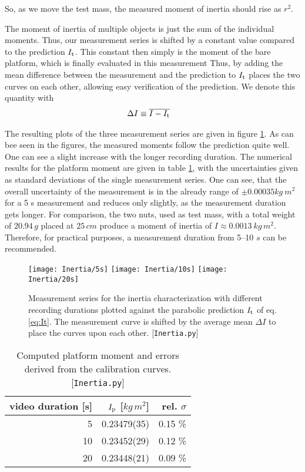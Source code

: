 \documentclass[journal]{IEEEtran}
\begin{document}
So, as we move the test mass, the measured moment of inertia should rise as $r^2$.

The moment of inertia of multiple objects is just the sum of the individual moments. Thus, our measurement series is shifted by a constant value compared to the prediction $I_{\textup{t}}$. This constant then simply is the moment of the bare platform, which is finally evaluated in this measurement
Thus, by adding the mean difference between the measurement and the prediction to $I_{\textup{t}}$ places the two curves on each other, allowing easy verification of the prediction.
We denote this quantity with
\begin{align}
	\Delta I & \equiv \overline{I - I_{\textup{t}}}
	\label{eq:DeltaI}
\end{align}

The resulting plots of the three measurement series are given in figure \ref{fig:Inertia}.
As can bee seen in the figures, the measured moments follow the prediction quite well. One can see a slight increase with the longer recording duration.
The numerical results for the platform moment are given in table \ref{tab:Inertia}, with the uncertainties given as standard deviations of the single measurement series.
One can see, that the overall uncertainty of the measurement is in the already range of $\pm 0.00035 \unit{kg~m^2}$ for a 5 s measurement and reduces only slightly, as the measurement duration gets longer. For comparison, the two nuts, used as test mass, with a total weight of $20.94\,\unit{g}$ placed at $25\,\unit{cm}$ produce a moment of inertia of $I \approx 0.0013~\unit{kg\,m^2}$.
Therefore, for practical purposes, a measurement duration from 5--10 $\unit{s}$ can be recommended.

\begin{figure}[t]
	\centering
	\texttt{[image: Inertia/5s]}
	\texttt{[image: Inertia/10s]}
	\texttt{[image: Inertia/20s]}
	\caption{Measurement series for the inertia characterization with different recording durations plotted against the parabolic prediction $I_{\textup{t}}$ of eq. \eqref{eq:It}. The measurement curve is shifted by the average mean $\Delta I$ to place the curves upon each other. [\texttt{Inertia.py}]}
	\label{fig:Inertia}
\end{figure}

\begin{table}
	\centering
	\begin{tabular}[h]{r | r  r}
		video duration [s] & $I_{\textup{p}}$ [$\unit{kg\,m^2}$] & rel. $\sigma$ \\
		\hline
		5	& 0.23479(35)	& 0.15 \% \\
		10	& 0.23452(29)	& 0.12 \% \\
		20	& 0.23448(21)	& 0.09 \% \\
	\end{tabular}
	\caption{Computed platform moment and errors derived from the calibration curves. [\texttt{Inertia.py}]}
	\label{tab:Inertia}
\end{table}
\end{document}
